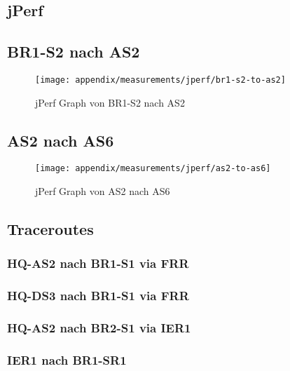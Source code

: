 \subsection{jPerf}

\subsection{BR1-S2 nach AS2}
\begin{figure}[h]
	\centering
	\texttt{[image: appendix/measurements/jperf/br1-s2-to-as2]}
	\caption{jPerf Graph von BR1-S2 nach AS2}
	\label{fig:as2-to-as6}
\end{figure}

\subsection{AS2 nach AS6}
\begin{figure}[h]
\centering
\texttt{[image: appendix/measurements/jperf/as2-to-as6]}
\caption{jPerf Graph von AS2 nach AS6}
\label{fig:as2-to-as6}
\end{figure}



\subsection{Traceroutes}
\subsubsection{HQ-AS2 nach BR1-S1 via FRR}


\subsubsection{HQ-DS3 nach BR1-S1 via FRR}


\subsubsection{HQ-AS2 nach BR2-S1 via IER1}


\subsubsection{IER1 nach BR1-SR1}


